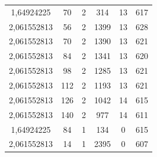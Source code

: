 \begin{table}[H]
\begin{tabular}{|c|c|c|c|c|c|}
				1,64924225          & 70              & 2                   & 314                                                                         & 13                                                                          & 617            \\
				2,061552813         & 56              & 2                   & 1399                                                                        & 13                                                                          & 628            \\
				2,061552813         & 70              & 2                   & 1390                                                                        & 13                                                                          & 621            \\
				2,061552813         & 84              & 2                   & 1341                                                                        & 13                                                                          & 620            \\
				2,061552813         & 98              & 2                   & 1285                                                                        & 13                                                                          & 621            \\
				2,061552813         & 112             & 2                   & 1193                                                                        & 13                                                                          & 621            \\
				2,061552813         & 126             & 2                   & 1042                                                                        & 14                                                                          & 615            \\
				2,061552813         & 140             & 2                   & 977                                                                         & 14                                                                          & 611            \\
				1,64924225          & 84              & 1                   & 134                                                                         & 0                                                                           & 615            \\
				2,061552813         & 14              & 1                   & 2395                                                                        & 0                                                                           & 607            \\

\end{tabular}
\end{table}
